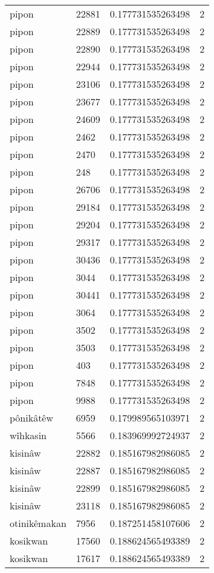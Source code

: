 \begin{longtable}{llll}
pipon & 22881 & 0.177731535263498 & 2 \\
pipon & 22889 & 0.177731535263498 & 2 \\
pipon & 22890 & 0.177731535263498 & 2 \\
pipon & 22944 & 0.177731535263498 & 2 \\
pipon & 23106 & 0.177731535263498 & 2 \\
pipon & 23677 & 0.177731535263498 & 2 \\
pipon & 24609 & 0.177731535263498 & 2 \\
pipon & 2462 & 0.177731535263498 & 2 \\
pipon & 2470 & 0.177731535263498 & 2 \\
pipon & 248 & 0.177731535263498 & 2 \\
pipon & 26706 & 0.177731535263498 & 2 \\
pipon & 29184 & 0.177731535263498 & 2 \\
pipon & 29204 & 0.177731535263498 & 2 \\
pipon & 29317 & 0.177731535263498 & 2 \\
pipon & 30436 & 0.177731535263498 & 2 \\
pipon & 3044 & 0.177731535263498 & 2 \\
pipon & 30441 & 0.177731535263498 & 2 \\
pipon & 3064 & 0.177731535263498 & 2 \\
pipon & 3502 & 0.177731535263498 & 2 \\
pipon & 3503 & 0.177731535263498 & 2 \\
pipon & 403 & 0.177731535263498 & 2 \\
pipon & 7848 & 0.177731535263498 & 2 \\
pipon & 9988 & 0.177731535263498 & 2 \\
pônikâtêw & 6959 & 0.179989565103971 & 2 \\
wîhkasin & 5566 & 0.183969992724937 & 2 \\
kisinâw & 22882 & 0.185167982986085 & 2 \\
kisinâw & 22887 & 0.185167982986085 & 2 \\
kisinâw & 22899 & 0.185167982986085 & 2 \\
kisinâw & 23118 & 0.185167982986085 & 2 \\
otinikêmakan & 7956 & 0.187251458107606 & 2 \\
kosikwan & 17560 & 0.188624565493389 & 2 \\
kosikwan & 17617 & 0.188624565493389 & 2 \\

\end{longtable}
